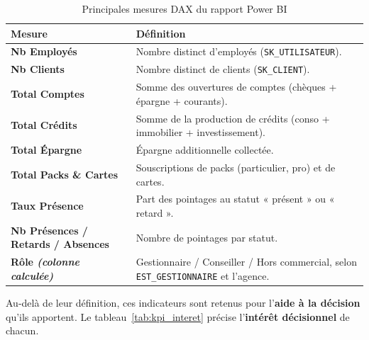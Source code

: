 \begin{table}[!htb]
\centering\small
\caption{Principales mesures DAX du rapport Power BI}
\label{tab:dax}
\renewcommand{\arraystretch}{1.15}
\begin{tabularx}{\textwidth}{|>{\bfseries}p{3.8cm}|X|}
\hline
\textmd{\textbf{Mesure}} & \textbf{Définition}\\
\hline
Nb Employés & Nombre distinct d'employés (\texttt{SK\_UTILISATEUR}).\\
\hline
Nb Clients & Nombre distinct de clients (\texttt{SK\_CLIENT}).\\
\hline
Total Comptes & Somme des ouvertures de comptes (chèques + épargne + courants).\\
\hline
Total Crédits & Somme de la production de crédits (conso + immobilier + investissement).\\
\hline
Total Épargne & Épargne additionnelle collectée.\\
\hline
Total Packs \& Cartes & Souscriptions de packs (particulier, pro) et de cartes.\\
\hline
Taux Présence & Part des pointages au statut « présent » ou « retard ».\\
\hline
Nb Présences / Retards / Absences & Nombre de pointages par statut.\\
\hline
Rôle \emph{(colonne calculée)} & Gestionnaire / Conseiller / Hors commercial, selon \texttt{EST\_GESTIONNAIRE} et l'agence.\\
\hline
\end{tabularx}
\end{table}

Au-delà de leur définition, ces indicateurs sont retenus pour l'\textbf{aide à la
décision} qu'ils apportent. Le tableau~\ref{tab:kpi_interet} précise l'\textbf{intérêt
décisionnel} de chacun.

